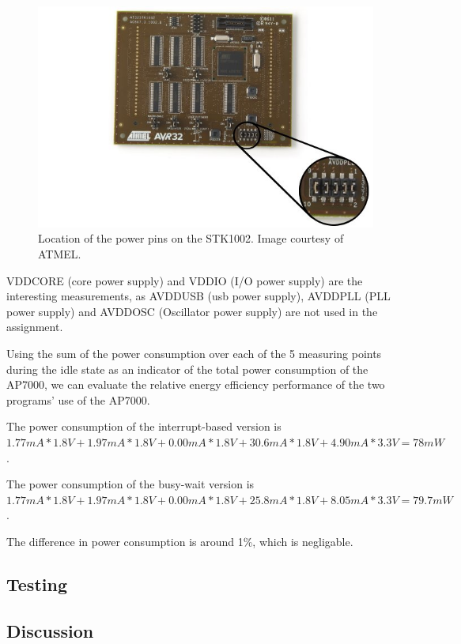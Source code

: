 \begin{figure}
\includegraphics[width = \textwidth]{results-and-tests/power-pins-location.jpg}
\caption{Location of the power pins on the STK1002. Image courtesy of ATMEL.}
\label{power-pins-location}
\end{figure}

VDDCORE (core power supply) and VDDIO (I/O power supply) are the interesting measurements, as AVDDUSB (usb power supply), AVDDPLL (PLL power supply) and AVDDOSC (Oscillator power supply) are not used in the assignment.

Using the sum of the power consumption over each of the 5 measuring points during the idle state as an indicator of the total power consumption of the AP7000, we can evaluate the relative energy efficiency performance of the two programs' use of the AP7000.

The power consumption of the interrupt-based version is 
$
1.77mA * 1.8V +
1.97mA * 1.8V +
0.00mA * 1.8V +
30.6mA * 1.8V +
4.90mA * 3.3V
=
78mW
$
.

The power consumption of the busy-wait version is 
$
1.77mA * 1.8V +
1.97mA * 1.8V +
0.00mA * 1.8V +
25.8mA * 1.8V +
8.05mA * 3.3V
=
79.7mW
$
.

The difference in power consumption is around 1\%, which is negligable.


\subsection{Testing}

	

\subsection{Discussion}

    
